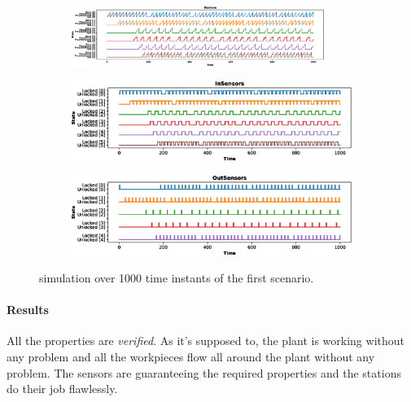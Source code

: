 \documentclass[a4paper]{article}
\begin{document}
    \begin{figure}[h!]
        \begin{subfigure}{\textwidth}
            \centering
            \includegraphics[width=0.9\textwidth]{images/scenarios/scenario1_stations}
        \end{subfigure}
        \begin{subfigure}{0.49\textwidth}
            \centering
            \includegraphics[width=\textwidth]{images/scenarios/scenario1_insensors}
        \end{subfigure}
        \hfill
        \begin{subfigure}{0.49\textwidth}
            \centering
            \includegraphics[width=\textwidth]{images/scenarios/scenario1_outsensors}
        \end{subfigure}
        \caption{simulation over 1000 time instants of the first scenario.}
        \label{figure:scenario:1}
    \end{figure}

    \paragraph{Results} All the properties are \textit{verified}. As it's supposed to, the plant is working without any problem and all the workpieces flow all around the plant without any problem. The sensors are guaranteeing the required properties and the stations do their job flawlessly.
\end{document}
